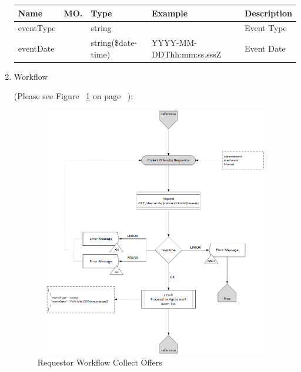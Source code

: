 \begin{enumerate}
\begin{tcolorbox}[boxrule=0pt, frame empty]
\begin{verbatim}
\end{verbatim}
\end{tcolorbox}

\begin{table}[H]
\footnotesize

\begin{center}
\begin{tabular}{|p{3cm}|l|p{3cm}|p{3cm}|p{4cm}|} 
\hline
\rowcolor{lightgray}	Name	& MO.	& Type	& Example & 	Description \\
\hline

eventType	& 	& 	string	&		&	Event Type \\ 
\hline

eventDate	& 	& 	string(\$date-time)	&	YYYY-MM-DDThh:mm:ss.sssZ	&	Event Date \\ 
\hline

\end{tabular}
\end{center}

\end{table}

\item Workflow

(Please see Figure ~\ref{fig:CO} on page ~\pageref{fig:CO}):

\begin{figure}[H]
    \centering
    \includegraphics[width=11cm,height=11cm,angle=0]{./diag/Workflow/Market/CollectOffers-R-Workflow.png}
    \caption{Requestor Workflow Collect Offers }
	\label{fig:CO}
\end{figure}


\end{enumerate}

